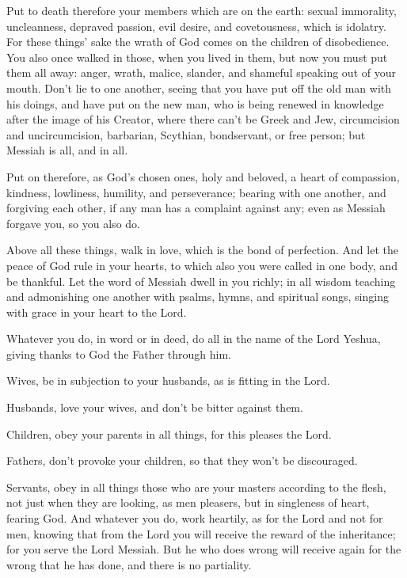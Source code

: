 \myverse{}Put to death therefore your members which are on the earth: sexual
immorality, uncleanness, depraved passion, evil desire, and covetousness, which is idolatry.
\myverse{}For these things’ sake the wrath of God comes on the children of disobedience.
\myverse{}You also once walked in those, when you lived in them,
\myverse{}but now you must put them all away: anger, wrath, malice, slander, and shameful
speaking out of your mouth.
\myverse{}Don’t lie to one another, seeing that you have put off the old man with his
doings,
\myverse{}and have put on the new man, who is being renewed in knowledge after the image
of his Creator,
\myverse{}where there can’t be Greek and Jew, circumcision and uncircumcision, barbarian,
Scythian, bondservant, or free person; but Messiah is all, and in all.

\myverse{}Put on therefore, as God’s chosen ones, holy and beloved, a heart
of compassion, kindness, lowliness, humility, and perseverance;
\myverse{}bearing with one another, and forgiving each other, if any man has a complaint
against any; even as Messiah forgave you, so you also do.

\myverse{}Above all these things, walk in love, which is the bond of perfection.
\myverse{}And let the peace of God rule in your hearts, to which also you were called
in one body, and be thankful.
\myverse{}Let the word of Messiah dwell in you richly; in all wisdom teaching and admonishing
one another with psalms, hymns, and spiritual songs, singing with grace in your heart to the Lord.

\myverse{}Whatever you do, in word or in deed, do all in the name of the Lord Yeshua,
giving thanks to God the Father through him.

\myverse{}Wives, be in subjection to your husbands, as is fitting in the
Lord.

\myverse{}Husbands, love your wives, and don’t be bitter against them.

\myverse{}Children, obey your parents in all things, for this pleases the
Lord.

\myverse{}Fathers, don’t provoke your children, so that they won’t be discouraged.

\myverse{}Servants, obey in all things those who are your masters according
to the flesh, not just when they are looking, as men pleasers, but in singleness of heart, fearing God.
\myverse{}And whatever you do, work heartily, as for the Lord and not for men,
\myverse{}knowing that from the Lord you will receive the reward of the inheritance;
for you serve the Lord Messiah.
\myverse{}But he who does wrong will receive again for the wrong that he has done, and
there is no partiality.


